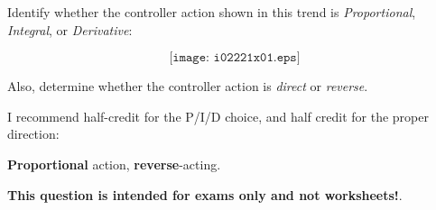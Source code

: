 

Identify whether the controller action shown in this trend is {\it Proportional}, {\it Integral}, or {\it Derivative}:

$$\texttt{[image: i02221x01.eps]}$$

Also, determine whether the controller action is {\it direct} or {\it reverse}.







I recommend half-credit for the P/I/D choice, and half credit for the proper direction:

\vskip 10pt

{\bf Proportional} action, {\bf reverse}-acting.







{\bf This question is intended for exams only and not worksheets!}.



